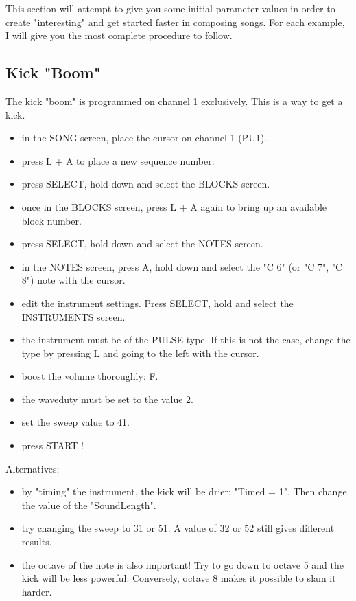 This section will attempt to give you some initial parameter values in order to create "interesting" and get started faster in composing songs.
For each example, I will give you the most complete procedure to follow.

\subsection{Kick "Boom"}

The kick "boom" is programmed on channel 1 exclusively. This is a way to get a kick.
\medskip

\begin{itemize}
\item{in the SONG screen, place the cursor on channel 1 (PU1).}
\item{press L + A to place a new sequence number.}
\item{press SELECT, hold down and select the BLOCKS screen.}
\item{once in the BLOCKS screen, press L + A again to bring up an available block number.}
\item{press SELECT, hold down and select the NOTES screen.}
\item{in the NOTES screen, press A, hold down and select the "C 6" (or "C 7", "C 8") note with the cursor.}
\item{edit the instrument settings. Press SELECT, hold and select the INSTRUMENTS screen.}
\item{the instrument must be of the PULSE type. If this is not the case, change the type by pressing L and going to the left with the cursor.}
\item{boost the volume thoroughly: F.}
\item{the waveduty must be set to the value 2.}
\item{set the sweep value to 41.}
\item{press START !}
\end{itemize}\medskip

Alternatives:
\medskip

\begin{itemize}
\item{by "timing" the instrument, the kick will be drier: "Timed = 1". Then change the value of the "SoundLength".}
\item{try changing the sweep to 31 or 51. A value of 32 or 52 still gives different results.}
\item{the octave of the note is also important! Try to go down to octave 5 and the kick will be less powerful. Conversely, octave 8 makes it possible to slam it harder.}
\end{itemize}\medskip

